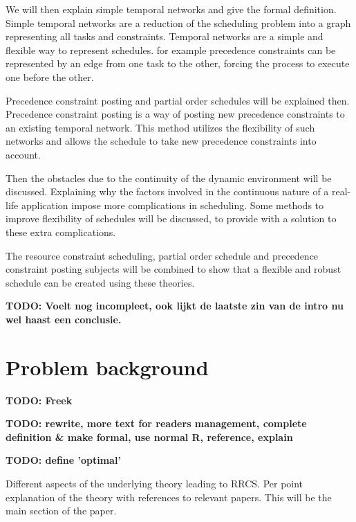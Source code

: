 \documentclass{article}
\newcommand{\TODO}[1]{{\color{red}\textbf{TODO: #1}}}
\begin{document}
We will then explain simple temporal networks and give the formal definition.
Simple temporal networks are a reduction of the scheduling problem into a graph representing all tasks and constraints.
Temporal networks are a simple and flexible way to represent schedules.
for example precedence constraints can be represented by an edge from one task to the other, forcing the process to execute one before the other.

Precedence constraint posting and partial order schedules will be explained then.
Precedence constraint posting is a way of posting new precedence constraints to an existing temporal network.
This method utilizes the flexibility of such networks and allows the schedule to take new precedence constraints into account.

Then the obstacles due to the continuity of the dynamic environment will be discussed.
Explaining why the factors involved in the continuous nature of a real-life application impose more complications in scheduling.
Some methods to improve flexibility of schedules will be discussed, to provide with a solution to these extra complications.

The resource constraint scheduling, partial order schedule and precedence constraint posting subjects will be combined to show that a flexible and robust schedule can be created using these theories.

\TODO{Voelt nog incompleet, ook lijkt de laatste zin van de intro nu wel haast een conclusie.}

\newpage

\section{Problem background}
\TODO{Freek}

\TODO{rewrite, more text for readers management, complete definition \& make formal, use normal R, reference, explain}

\TODO{define 'optimal'}

Different aspects of the underlying theory leading to RRCS.
 Per point explanation of the theory with references to relevant papers.
This will be the main section of the paper.
\end{document}
